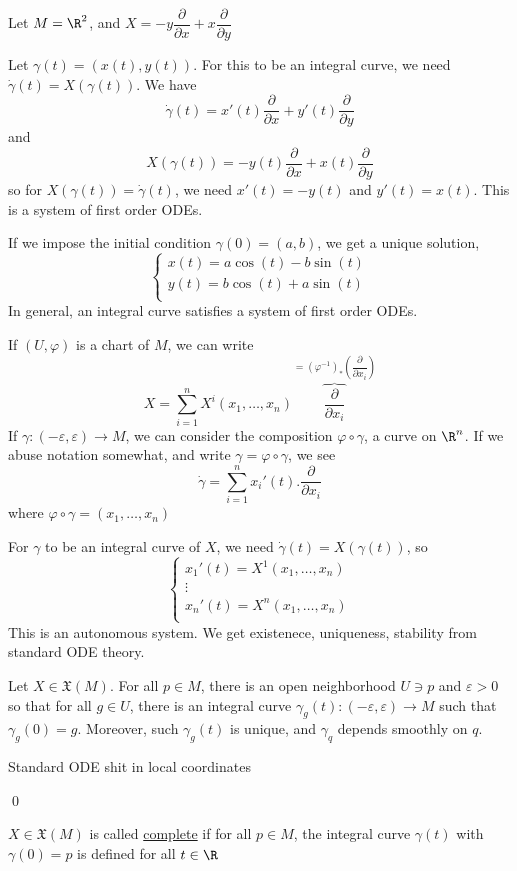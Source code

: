 \documentclass[x11names,reqno,14pt]{extarticle}
\newcommand{\pp}[2]{\dfrac{\partial #1}{\partial #2}}
\newcommand{\mk}[1]{\mathfrak{#1}}
\renewcommand{\phi}{\varphi}
\begin{document}
Let $M = \R^2$, and $X = -y\pp{}{x} + x\pp{}{y}$

Let $\gamma(t) = (x(t), y(t))$. For this to be an integral curve, we need $\dot{\gamma}(t) = X(\gamma(t))$. We have
\[
\dot{\gamma}(t) = x'(t)\pp{}{x} + y'(t)\pp{}{y}
\]
and
\[
X(\gamma(t)) = -y(t)\pp{}{x} + x(t)\pp{}{y}
\]
so for $X(\gamma(t)) = \dot{\gamma}(t)$, we need $x'(t) = -y(t)$ and $y'(t) = x(t)$. This is a system of first order ODEs. 

If we impose the initial condition $\gamma(0) = (a, b)$, we get a unique solution, 
\[
\begin{cases}
x(t) = a\cos(t) - b\sin(t) \\
y(t) = b\cos(t) + a\sin(t) \\
\end{cases}
\]
In general, an integral curve satisfies a system of first order ODEs. 

If $(U, \phi)$ is a chart of $M$, we can write
\[
X = \sum_{i=1}^n X^i(x_1, \dots, x_n)\overbrace{\pp{}{x_i}}^{=(\phi^{-1})_*\left(\pp{}{x_i}\right)}
\]
If $\gamma:(-\varepsilon,\varepsilon)\to M$, we can consider the composition $\phi\circ\gamma$, a curve on $\R^n$. If we abuse notation somewhat, and write $\gamma = \phi\circ\gamma$, we see
\[
\dot{\gamma} = \sum_{i=1}^nx_i'(t). \pp{}{x_i}
\]
where $\phi\circ\gamma = (x_1, \dots, x_n)$

For $\gamma$ to be an integral curve of $X$, we need $\dot{\gamma}(t) = X(\gamma(t))$, so 
\[
\begin{cases}
x_1'(t) = X^1(x_1, \dots, x_n) \\
\vdots \\
x_n'(t) = X^n(x_1, \dots, x_n) \\
\end{cases}
\]
This is an autonomous system. We get existenece, uniqueness, stability from standard ODE theory. 

\prop

Let $X \in\mk{X}(M)$. For all $p \in M$, there is an open neighborhood $U \ni p$ and $\varepsilon>0$ so that for all $g \in U$, there is an integral curve $\gamma_g(t):(-\varepsilon,\varepsilon) \to M$ such that $\gamma_g(0) = g$. Moreover, such $\gamma_g(t)$ is unique, and $\gamma_q$ depends smoothly on $q$. 

\proof

Standard ODE shit in local coordinates

\qed


$X \in \mk{X}(M)$ is called \underline{complete} if for all $p\in M$, the integral curve $\gamma(t)$ with $\gamma(0) = p$ is defined for all $t\in\R$
\end{document}
